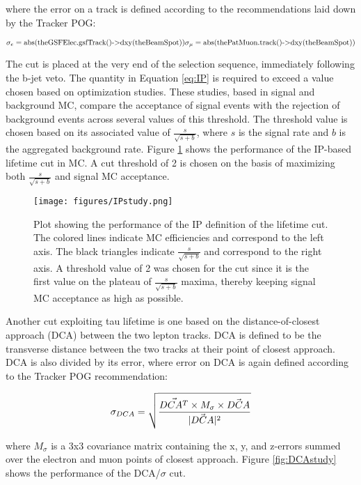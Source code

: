 \noindent where the error on a track is defined according to the recommendations laid down by the Tracker POG\cite{TrackerPOG}:

\begin{equation}
\centering
\sigma_e = \textrm{abs(theGSFElec.gsfTrack()->dxy(theBeamSpot))}
\sigma_\mu = \textrm{abs(thePatMuon.track()->dxy(theBeamSpot))}
\end{equation}

The cut is placed at the very end of the selection sequence, immediately following the b-jet veto. The quantity in Equation \ref{eq:IP} is required to exceed a value chosen based on optimization studies. These studies, based in signal and background MC, compare the acceptance of signal events with the rejection of background events across several values of this threshold. The threshold value is chosen based on its associated value of $\frac{s}{\sqrt{s+b}}$, where $s$ is the signal rate and $b$ is the aggregated background rate. Figure \ref{fig:IPstudy} shows the performance of the IP-based lifetime cut in MC. A cut threshold of 2 is chosen on the basis of maximizing both $\frac{s}{\sqrt{s+b}}$ and signal MC acceptance.


\begin{figure}[tbh!]
\centering
\texttt{[image: figures/IPstudy.png]}
\caption{Plot showing the performance of the IP definition of the lifetime cut. The colored lines indicate MC efficiencies and correspond to the left axis. The black triangles indicate $\frac{s}{\sqrt{s+b}}$ and correspond to the right axis. A threshold value of 2 was chosen for the cut since it is the first value on the plateau of $\frac{s}{\sqrt{s+b}}$ maxima, thereby keeping signal MC acceptance as high as possible.}
\label{fig:IPstudy}
\end{figure}


Another cut exploiting tau lifetime is one based on the distance-of-closest approach (DCA) between the two lepton tracks. DCA is defined to be the transverse distance between the two tracks at their point of closest approach. DCA is also divided by its error, where error on DCA is again defined according to the Tracker POG recommendation\cite{TrackerPOG}:

\begin{equation}
\centering
\sigma_{DCA} = \sqrt{\frac{\vec{DCA^T}\times M_\sigma\times\vec{DCA}}{|\vec{DCA}|^2}}
\end{equation}

\noindent where $M_\sigma$ is a 3x3 covariance matrix containing the x, y, and z-errors summed over the electron and muon points of closest approach. Figure \ref{fig:DCAstudy} shows the performance of the DCA/$\sigma$ cut.

